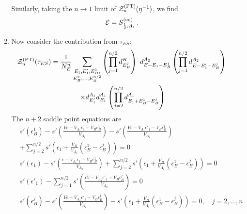 \documentclass[a4paper,11pt]{article}
\newcommand{\be}{\begin{equation}}
\newcommand{\ee}{\end{equation}}
\newcommand\sE{{\ensuremath{{\mathcal E}}}}
\newcommand\sZ{{\mathcal Z}}
\begin{document}
\begin{enumerate}
\begin{appendix}
\begin{enumerate}
Similarly, taking the $n\rightarrow 1$ limit of $\sZ_n^{\rm (PT)}(\eta^{-1})$, we find 
\be
\sE = S^{\rm (eq)}_{\frac{1}{2}, A_1} \, . 
\ee
 
\item Now consider the contribution from $\tau_{ES}$:
 \be 
 \begin{gathered} 
 \sZ_n^{\rm (PT)}(\tau_{ES}) = \frac{1}{N_E^n}\sum_{\substack{E_{1}, E'_{1}, E_{B}^1,\\ E_{B}^2,..., E_{B}^{n/2}}}\left( \prod_{j=1}^{n/2} d^B_{E_B^j}\right)
~ d^{A_2}_{E- E_{1}- E_{B}^1} \left( \prod_{j=1}^{n/2} d^{A_2}_{E- E'_{1}-E_{B}^j}\right)\\
~ \times d^{A_1}_{E'_{1}} d^{A_1}_{E_{1}} \left(\prod_{j=2}^{n/2} d^{A_1}_{E_{1} + E_{B}^1-E_{B}^j}\right) 
 \end{gathered} 
 \ee
 The $n+2$ saddle point equations are 
 \begin{align}
 &s'(\epsilon_{B}^1) -s'\left(\frac{V\epsilon- V_{A_1} \epsilon_{1}- V_B\epsilon_{B}^1}{V_{A_2}} \right) - s'\left(\frac{V \epsilon - V_{A_1} \epsilon'_{1} -V_B\epsilon_{B}^1}{V_{A_2}} \right) \nonumber \\ 
 &+ \sum_{j=2}^{n/2} s'\left( \epsilon_{1} + \frac{V_B}{V_{A_1}}(\epsilon_{B}^1- \epsilon_{B}^j)\right) = 0\\
 &s'(\epsilon_{1}) -s'\left(\frac{\epsilon - V_{A_1} \epsilon_{1}- V_B\epsilon_{B}^1}{V_{A_2}} \right) + \sum_{j=2}^{n/2} s'\left(\epsilon_{1}+\frac{V_B}{V_{A_2}}(\epsilon_{B}^1-\epsilon_{B}^j)\right) = 0\\
 &s'(\epsilon'_{1}) - \sum_{j=1}^{n/2} s'\left(\frac{\epsilon V - V_{A_1} \epsilon'_{1} - V_B\epsilon_{B}^j}{V_{A_2}} \right)=0 \\
 &s'(\epsilon_{B}^j) - s'\left(\frac{V\epsilon-V_{A_1} \epsilon'_{1}-V_B\epsilon_{B}^j}{V_{A_2}} \right) - s'\left(\epsilon_{1}+\frac{V_B}{V_{A_1}}(\epsilon_{B}^1-\epsilon_{B}^j)\right) = 0 , \quad j= 2, ..., n 

\end{align}
\end{enumerate}
\end{appendix}
\end{enumerate}
\end{document}
